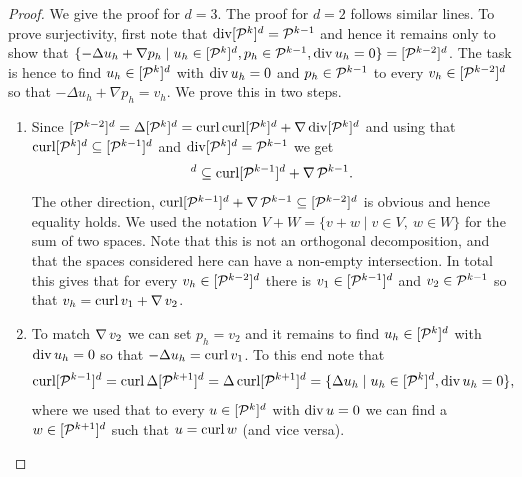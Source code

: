 \documentclass[pdflatex,sn-mathphys,Numbered]{sn-jnl}%
\theoremstyle{remark}%
\theoremstyle{definition}%
\begin{document}
\begin{proof}
  We give the proof for $d=3$. The proof for $d=2$ follows similar lines. 
  To prove surjectivity, first note that $\operatorname{\mathrm{div}} [\mathcal{P}^{k}]^d = \mathcal{P}^{k-1}$ and hence it remains only to show that $\{-\Delta u_h + \nabla p_h \mid u_h\in[\mathcal{P}^k]^d, p_h\in\mathcal{P}^{k-1}, \operatorname{\mathrm{div}} u_h=0\}=[\mathcal{P}^{k-2}]^d$. The task is hence to find $u_h \in [\mathcal{P}^k]^d$ with $\operatorname{\mathrm{div}} u_h = 0$ and $p_h \in \mathcal{P}^{k-1}$ to every $v_h\in [\mathcal{P}^{k-2}]^d$ so that $-\Delta u_h + \nabla p_h = v_h$. We prove this in two steps.
\begin{enumerate}
    \item
    Since
    $[\mathcal{P}^{k-2}]^d=\Delta [\mathcal{P}^{k}]^d=\operatorname{\mathrm{curl}}\operatorname{\mathrm{curl}}[\mathcal{P}^{k}]^d + \operatorname{\nabla}\operatorname{\mathrm{div}}[\mathcal{P}^{k}]^d$ and using that  $\operatorname{\mathrm{curl}}[\mathcal{P}^{k}]^d \subseteq [\mathcal{P}^{k-1}]^d$ and $\operatorname{\mathrm{div}}[\mathcal{P}^{k}]^d = \mathcal{P}^{k-1}$ we get 
    \begin{equation*}
      [\cP^{k-2}]^d \subseteq \Curl[\cP^{k-1}]^d + \Grad\cP^{k-1}.
    \end{equation*}
    The other direction, $\operatorname{\mathrm{curl}}[\mathcal{P}^{k-1}]^d + \operatorname{\nabla}\mathcal{P}^{k-1}
    \subseteq [\mathcal{P}^{k-2}]^d$ is obvious and hence equality holds. We
    used the notation $V+W=\{v+w\mid v\in V,\ w\in W\}$ for the sum of
    two spaces. Note that this is not an orthogonal decomposition, and
    that the spaces considered here can have a non-empty intersection.
    In total this gives that for every $v_h\in [\mathcal{P}^{k-2}]^d$ there is
    $v_1 \in [\mathcal{P}^{k-1}]^d$ and $v_2 \in \mathcal{P}^{k-1}$ so that $v_h =
    \operatorname{\mathrm{curl}} v_1 + \operatorname{\nabla} v_2$.
    \item To match $\operatorname{\nabla} v_2$ we can set $p_h = v_2$ and it remains to find $u_h \in [\mathcal{P}^k]^d$ with $\operatorname{\mathrm{div}} u_h = 0$ so that $-\Delta u_h = \operatorname{\mathrm{curl}} v_1$. 
    To this end note that 
    \begin{equation*}
      \operatorname{\mathrm{curl}} [\mathcal{P}^{k-1}]^d= \operatorname{\mathrm{curl}} \Delta [\mathcal{P}^{k+1}]^d=  \Delta \operatorname{\mathrm{curl}} [\mathcal{P}^{k+1}]^d = \{\Delta u_h\mid u_h\in[\mathcal{P}^{k}]^d, \operatorname{\mathrm{div}} u_h=0\},
    \end{equation*}
    where we used that to every $u\in[\mathcal{P}^{k}]^d$ with $\operatorname{\mathrm{div}} u=0$ we can find a $w\in[\mathcal{P}^{k+1}]^d$ such that $u=\operatorname{\mathrm{curl}} w$ (and vice versa).

\end{enumerate}
\end{proof}
\end{document}
